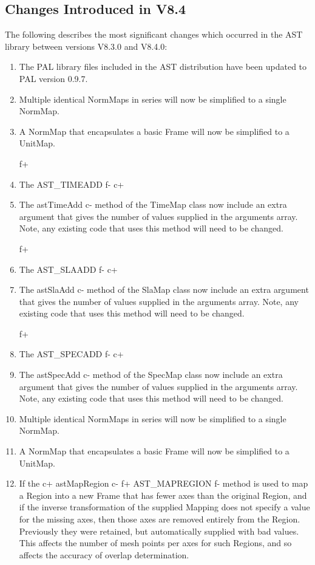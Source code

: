 \documentclass[twoside,11pt]{starlink}
\begin{document}
\subsection{Changes Introduced in V8.4}
The following describes the most significant changes which
occurred in the AST library between versions V8.3.0 and V8.4.0:

\begin{enumerate}

\item The PAL library files included in the AST distribution have been updated
to PAL version 0.9.7.

\item Multiple identical NormMaps in series will now be simplified to a
single NormMap.

\item A NormMap that encapsulates a basic Frame will now be simplified to a
UnitMap.

f+
\item The AST\_TIMEADD
f-
c+
\item The astTimeAdd
c-
method of the TimeMap class now include an extra argument that gives the
number of values supplied in the arguments array. Note, any existing code
that uses this method will need to be changed.

f+
\item The AST\_SLAADD
f-
c+
\item The astSlaAdd
c-
method of the SlaMap class now include an extra argument that gives the
number of values supplied in the arguments array. Note, any existing code
that uses this method will need to be changed.

f+
\item The AST\_SPECADD
f-
c+
\item The astSpecAdd
c-
method of the SpecMap class now include an extra argument that gives the
number of values supplied in the arguments array. Note, any existing code
that uses this method will need to be changed.

\item Multiple identical NormMaps in series will now be simplified to a
single NormMap.

\item A NormMap that encapsulates a basic Frame will now be simplified to a
UnitMap.

\item If the
c+
astMapRegion
c-
f+
AST\_MAPREGION
f-
method is used to map a Region into a new Frame that has fewer axes than
the original Region, and if the inverse transformation of the supplied
Mapping does not specify a value for the missing axes, then those axes
are removed entirely from the Region. Previously they were retained, but
automatically supplied with bad values. This affects the number of mesh
points per axes for such Regions, and so affects the accuracy of overlap
determination.

\end{enumerate}
\end{document}
